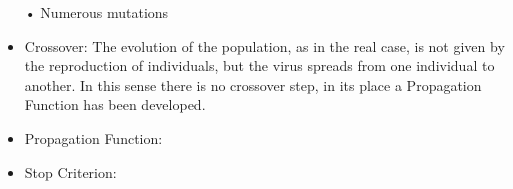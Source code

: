 \documentclass[letterpaper]{article}%
\begin{document}
\begin{itemize}
• Numerous mutations
\item Crossover: The evolution of the population, as in the real case, is not given by the reproduction of individuals, but the virus spreads from one individual to another. In this sense there is no crossover step, in its place a Propagation Function has been developed.
\item Propagation Function:
\item Stop Criterion:
\end{itemize}
\end{document}

